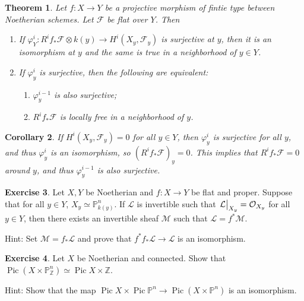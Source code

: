 \documentclass[leqno, openany]{memoir}
\newtheorem{thm}{Theorem}[section]
\newtheorem{cor}[thm]{Corollary}
\theoremstyle{definition}
\newtheorem{exer}[thm]{Exercise}
\theoremstyle{remark}
\theoremstyle{plain}
\theoremstyle{definition}
\theoremstyle{remark}
\newcommand{\Z}{\mathbb{Z}}
\renewcommand{\P}{\mathbb{P}}
\newcommand{\mc}[1]{\mathcal{#1}}
\DeclareMathOperator{\Pic}{Pic}
\begin{document}
\begin{thm} Let $f \colon X \to Y$ be a projective morphism of fintie type
    between Noetherian schemes. Let $\mc{F}$ be flat over $Y$. Then
    \begin{enumerate} \item If $\varphi^i_Y \colon  R^i f_* \mc{F} \otimes k(y)
        \to H^i(X_y, \mc{F}_y)$ is surjective at $y$, then it is an isomorphism
        at $y$ and the same is true in a neighborhood of $y \in Y$.  \item If
        $\varphi_y^i$ is surjective, then the following are equivalent:
        \begin{enumerate} \item $\varphi_y^{i-1}$ is also surjective; \item
            $R^i f_* \mc{F}$ is locally free in a neighborhood of $y$.
    \end{enumerate} \end{enumerate} \end{thm}

\begin{cor} If $H^i(X_y, \mc{F}_y) = 0$ for all $y \in Y$, then $\varphi_y^i$
    is surjective for all $y$, and thus $\varphi_y^i$ is an isomorphism, so
    ${(R^i f_* \mc{F})}_y = 0$. This implies that $R^i f_* \mc{F} = 0$ around
    $y$, and thus $\varphi_y^{i-1}$ is also surjective.  \end{cor}

\begin{exer} Let $X, Y$ be Noetherian and $f \colon X \to Y$ be flat and
    proper. Suppose that for all $y \in Y$, $X_y \simeq \P^n_{k(y)}$. If
    $\mc{L}$ is invertible such that $\eval{\mc{L}}_{X_y} = \mc{O}_{X_y}$ for
    all $y \in Y$, then there exists an invertible sheaf $\mc{M}$ such that
    $\mc{L} = f^* \mc{M}$.

    Hint: Set $\mc{M} = f_* \mc{L}$ and prove that $f^* f_* \mc{L} \to \mc{L}$
is an isomorphism.  \end{exer}

\begin{exer} Let $X$ be Noetherian and connected. Show that $\Pic(X \times
    \P^n_{\Z}) \simeq \Pic X \times \Z$.

    Hint: Show that the map $\Pic X \times \Pic \P^n \to \Pic (X \times \P^n)$
is an isomorphism.  \end{exer}
\end{document}
